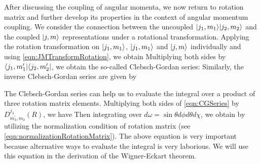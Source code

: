 After discussing the coupling of angular momenta, we now return to rotation matrix and further develop its 
properties in the context of angular momentum coupling. We consider the connection between the uncoupled 
 $| j_1, m_1 \rangle| j_2, m_2 \rangle$ and the coupled $| j, m \rangle$ representations under a rotational transformation. 
Applying the rotation transformation on $| j_1, m_1 \rangle$, $| j_1, m_1 \rangle$ and $| j, m \rangle$ individually and using
\autoref{eqn:JMTransformRotation}, we obtain
Multiplying both sides by $\langle j_1, m_1^{\prime} |\langle j_2, m_2^{\prime}  |$, we obtain the so-called Clebsch-Gordan 
series:
Similarly, the inverse Clebsch-Gordan series are given by

The Clebsch-Gordan series can help us to evaluate the integral over a product of three rotation matrix elements. 
Multiplying both sides of \autoref{eqn:CGSeries} by $D^{j_3}_{m_3^{\prime}, m_3}(R)$, we have
Then integrating over $d\omega = \sin\theta d\phi d\theta d\chi$, we obtain
by utilizing the normalization condition of rotation matrix (see \autoref{eqn:normalizationRotationMatrix}). The 
above equation is very important because alternative ways to evaluate the integral is very laborious. We will use this
equation in the derivation of the Wigner-Eckart theorem. 

